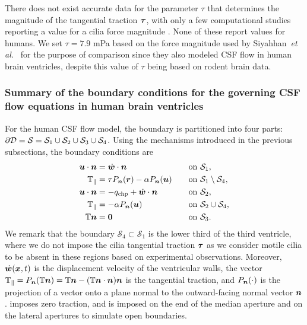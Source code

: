 \documentclass{template}
\begin{document}
There does not exist accurate data for the parameter $\tau$ that
determines the magnitude of the tangential traction $\bm{\tau}$, with only a few computational
studies reporting a value for a cilia force magnitude
\cite{Herlyng2025AdvectionDiffusion, Siyahhan2014FlowVentricles,
Thouvenin2020OriginCanal}. None of these report values for humans.
We set $\tau=7.9$ mPa based on the force magnitude used by
Siyahhan~\emph{et al.}~\cite{Siyahhan2014FlowVentricles}
for the purpose of comparison
since they also modeled CSF flow in human brain ventricles,
despite this value of $\tau$ being based on rodent brain data.

\subsubsection{Summary of the boundary conditions
for the governing CSF flow equations in human brain ventricles}
\label{sec:boundary_conditions_human}

For the human CSF flow model, the boundary is partitioned into
four parts: $\partial\mathcal{D} = \mathcal{S} = \mathcal{S}_1\cup\mathcal{S}_2\cup\mathcal{S}_3\cup\mathcal{S}_4$.
Using the mechanisms introduced in the previous subsections,
the boundary conditions are
\begin{alignat}{2}
    \uu\cdot\nn &= \dot{\ww}\cdot\nn &&\quad\mathrm{on \ \mathcal{S}_1}, \\
    \TT_{\parallel} &= \tau P_{\nn}(\rr) - \alpha P_{\nn}(\uu)
    &&\quad\mathrm{on \ \mathcal{S}_1\setminus\mathcal{S}_4}, \label{eq:cilia_bc} \\
    \uu\cdot\nn &= -q_{\mathrm{chp}} + \dot{\ww}\cdot\nn &&\quad\mathrm{on \ \mathcal{S}_2}, \\
    \TT_{\parallel} &= - \alpha P_{\nn}(\uu) &&\quad\mathrm{on \ \mathcal{S}_2\cup\mathcal{S}_4}, \label{eq:navier_bc} \\
    \TT\nn &= \bm{0} &&\quad\mathrm{on \ \mathcal{S}_3}. \label{eq:outlet_bc}
\end{alignat}
We remark that the boundary $\mathcal{S}_4\subset\mathcal{S}_1$ is the lower third of
the third ventricle, where we do not impose the cilia tangential traction $\bm{\tau}$
as we consider motile cilia to be absent in these regions based on experimental
observations. Moreover, $\dot{\bm{w}}(\bm{x}, t)$ is the displacement velocity of the ventricular walls,
the vector $\mathbb{T}_{\parallel}=P_{\bm{n}}(\mathbb{T}\bm{n})=\mathbb{T}\bm{n} - (\mathbb{T}\bm{n}\cdot\bm{n})\bm{n}$
is the tangential traction, and $P_{\bm{n}}(\cdot)$ is the projection
of a vector onto a plane normal
to the outward-facing normal vector $\bm{n}$. 
 imposes zero traction,
and is imposed on the end of the median aperture and on the lateral apertures
to simulate open boundaries.
\end{document}
